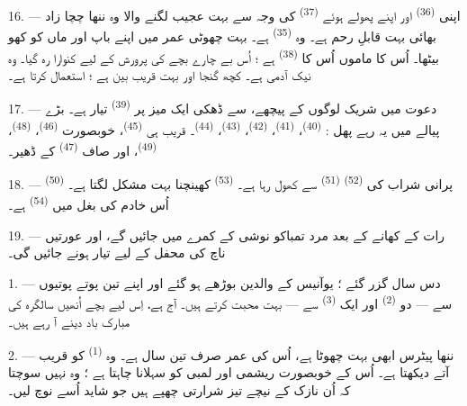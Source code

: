 16. --- اپنی  \textsuperscript{(36)} اور اپنے پھولے ہوئے
 \textsuperscript{(37)} کی وجہ سے بہت
عجیب لگنے والا وہ ننھا چچا زاد بھائی بہت قابلِ رحم ہے۔ وہ
 \textsuperscript{(35)} ہے۔ بہت چھوٹی عمر میں اپنے باپ
اور ماں کو کھو بیٹھا۔ اُس کا ماموں اُس کا 
\textsuperscript{(38)} ہے ؛ اُس بے چارے بچے کی پرورش کے لیے کنوارا
رہ گیا۔ وہ نیک آدمی ہے۔ کچھ گنجا اور بہت قریب بین ہے ؛  استعمال کرتا ہے۔

\VUsaut{2.4mm}
\VUsaut{3.0mm}

17. --- دعوت میں شریک لوگوں کے پیچھے،  سے ڈھکی ایک
میز پر  \textsuperscript{(39)} تیار ہے۔ بڑے پیالے میں
یہ رہے پھل :  \textsuperscript{(40)}،
 \textsuperscript{(41)}، 
\textsuperscript{(42)}،  \textsuperscript{(43)}،
 \textsuperscript{(44)}۔ قریب ہی 
\textsuperscript{(45)}، خوبصورت  \textsuperscript{(46)}،
 \textsuperscript{(48)}، 
\textsuperscript{(49)}، اور صاف  \textsuperscript{(47)}
کے ڈھیر۔

18. ---  \textsuperscript{(50)} پرانی شراب کی
 \textsuperscript{(52)} 
\textsuperscript{(51)} سے کھول رہا ہے۔ 
\textsuperscript{(53)} کھینچنا بہت مشکل لگتا ہے۔ اُس خادم کی بغل میں
 \textsuperscript{(54)} ہے۔

19. --- رات کے کھانے کے بعد مرد تمباکو نوشی کے کمرے میں جائیں گے، اور
عورتیں ناچ کی محفل کے لیے تیار ہونے جائیں گی۔

\VUsaut{5.0mm}
\VUsaut{1.6mm}
\VUsaut{2.6mm}

\VUsaut{3.0mm}

1. --- دس سال گزر گئے ؛ یوآنیس کے والدین بوڑھے ہو گئے اور اپنے تین
پوتے پوتیوں سے — دو  \textsuperscript{(2)} اور ایک
 \textsuperscript{(3)} سے — بہت محبت کرتے ہیں۔ آج
 ہے، اِس لیے بچے اُنھیں سالگرہ کی مبارک باد
دینے آ رہے ہیں۔

2. --- ننھا پیٹرس ابھی بہت چھوٹا ہے، اُس کی عمر صرف تین سال ہے۔ وہ
 \textsuperscript{(1)} کو قریب آتے دیکھتا ہے۔ اُس کے
خوبصورت ریشمی  اور لمبی  کو سہلانا چاہتا
ہے ؛ وہ نہیں سوچتا کہ اُن نازک  کے نیچے تیز شرارتی
 چھپے ہیں جو شاید اُسے نوچ لیں۔

